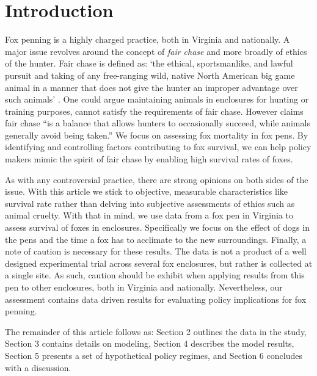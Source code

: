\documentclass[aoas,preprint]{imsart}
\numberwithin{equation}{section}
\theoremstyle{plain}
\begin{document}
\section{Introduction}

Fox penning is a highly charged practice, both in Virginia and nationally. A major issue revolves around the concept of \emph{fair chase} \citep{posewitz} and more broadly of ethics of the hunter. Fair chase is defined as: `the ethical, sportsmanlike, and lawful pursuit and taking of any free-ranging wild, native North American big game animal in a manner that does not give the hunter an improper advantage over such animals' \citep{boone}. One could argue maintaining animals in enclosures for hunting or training purposes, cannot satisfy the requirements of fair chase.  However \cite{posewitz} claims fair chase ``is a balance that allows hunters to occasionally succeed, while animals generally avoid being taken.'' We focus on assessing fox mortality in fox pens. By identifying and controlling factors contributing to fox survival, we can help policy makers mimic the spirit of fair chase by enabling high survival rates of foxes.

As with any controversial practice, there are strong opinions on both sides of the issue. With this article we stick to objective, measurable characteristics like survival rate rather than delving into subjective assessments of ethics such as animal cruelty. With that in mind, we use data from a fox pen in Virginia to assess survival of foxes in enclosures. Specifically we focus on the effect of dogs in the pens and the time a fox has to acclimate to the new surroundings. Finally, a note of caution is necessary for these results. The data is not a product of a well designed experimental trial across several fox enclosures, but rather is collected at a single site. As such, caution should be exhibit when applying results from this pen to other enclosures, both in Virginia and nationally. Nevertheless, our assessment contains data driven results for evaluating policy implications for fox penning.

The remainder of this article follows as: Section 2 outlines the data in the study, Section 3 contains details on modeling, Section 4 describes the model results, Section 5 presents a set of hypothetical policy regimes, and Section 6 concludes with a discussion.
\end{document}
